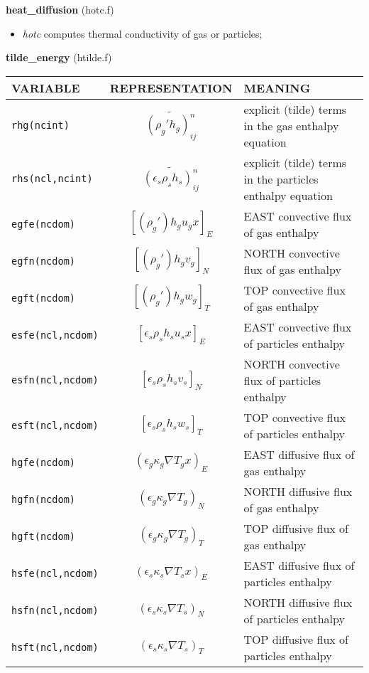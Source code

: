 %
%
{\large{\bf heat\_diffusion}} (hotc.f)\\
\begin{itemize}
\item{\em hotc} computes thermal conductivity of gas or particles;
\end{itemize}
%
%
{\large {\bf tilde\_energy}} (htilde.f)\\[5mm]
\begin{tabular}{|p{6cm}|c|p{6cm}|}\hline
VARIABLE & REPRESENTATION & MEANING\\\hline
\tt rhg(ncint) & $\widetilde{(\rho_g'h_g)_{ij}^n}$ & explicit (tilde) terms in the gas enthalpy equation\\\hline
\tt rhs(ncl,ncint)& $\widetilde{(\epsilon_s \rho_s h_s)_{ij}^n}$ & explicit (tilde) terms in the particles enthalpy equation\\\hline
\tt egfe(ncdom) & $\left[ (\rho_g')h_g u_g x \right]_{E}$ &EAST convective flux of gas enthalpy\\\hline
\tt egfn(ncdom) & $\left[ (\rho_g')h_g v_g \right]_{N}$ &NORTH convective flux of gas enthalpy\\\hline
\tt egft(ncdom) & $\left[ (\rho_g')h_g w_g \right]_{T}$ &TOP convective flux of gas enthalpy\\\hline
\tt esfe(ncl,ncdom)& $\left[ \epsilon_s\rho_sh_su_s x\right]_{E}$ &EAST convective flux of particles enthalpy\\\hline
\tt esfn(ncl,ncdom)& $\left[ \epsilon_s\rho_sh_sv_s \right]_{N}$ &NORTH convective flux of particles enthalpy\\\hline
\tt esft(ncl,ncdom)& $\left[ \epsilon_s\rho_sh_sw_s \right]_{T}$ &TOP convective flux of particles enthalpy\\\hline
\tt hgfe(ncdom)&$ (\epsilon_g \kappa_g \nabla T_gx)_{E}$ &EAST diffusive flux of gas enthalpy\\\hline
\tt hgfn(ncdom)&$ (\epsilon_g \kappa_g \nabla T_g)_{N}$ &NORTH diffusive flux of gas enthalpy\\\hline
\tt hgft(ncdom)&$ (\epsilon_g \kappa_g \nabla T_g)_{T}$ &TOP diffusive flux of gas enthalpy\\\hline
\tt hsfe(ncl,ncdom)&$ (\epsilon_s \kappa_s \nabla T_sx)_{E}$ &EAST diffusive flux of particles enthalpy\\\hline
\tt hsfn(ncl,ncdom)&$ (\epsilon_s \kappa_s \nabla T_s)_{N}$ &NORTH diffusive flux of particles enthalpy\\\hline
\tt hsft(ncl,ncdom)&$ (\epsilon_s \kappa_s \nabla T_s)_{T}$ &TOP diffusive flux of particles enthalpy\\\hline
\end{tabular}\\
